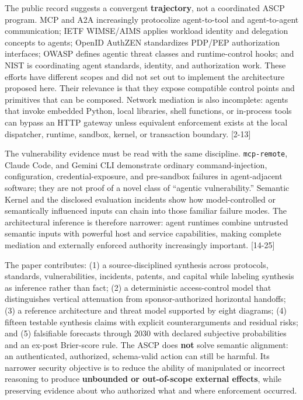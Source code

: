 \documentclass[
  10pt,
  letterpaper,
]{article}
\begin{document}
The public record suggests a convergent \textbf{trajectory}, not a
coordinated ASCP program. MCP and A2A increasingly protocolize
agent-to-tool and agent-to-agent communication; IETF WIMSE/AIMS applies
workload identity and delegation concepts to agents; OpenID AuthZEN
standardizes PDP/PEP authorization interfaces; OWASP defines agentic
threat classes and runtime-control hooks; and NIST is coordinating agent
standards, identity, and authorization work. These efforts have
different scopes and did not set out to implement the architecture
proposed here. Their relevance is that they expose compatible control
points and primitives that can be composed. Network mediation is also
incomplete: agents that invoke embedded Python, local libraries, shell
functions, or in-process tools can bypass an HTTP gateway unless
equivalent enforcement exists at the local dispatcher, runtime, sandbox,
kernel, or transaction boundary. {[}2-13{]}

The vulnerability evidence must be read with the same discipline.
\texttt{mcp-remote}, Claude Code, and Gemini CLI demonstrate ordinary
command-injection, configuration, credential-exposure, and pre-sandbox
failures in agent-adjacent software; they are not proof of a novel class
of ``agentic vulnerability.'' Semantic Kernel and the disclosed
evaluation incidents show how model-controlled or semantically
influenced inputs can chain into those familiar failure modes. The
architectural inference is therefore narrower: agent runtimes combine
untrusted semantic inputs with powerful host and service capabilities,
making complete mediation and externally enforced authority increasingly
important. {[}14-25{]}

The paper contributes: (1) a source-disciplined synthesis across
protocols, standards, vulnerabilities, incidents, patents, and capital
while labeling synthesis as inference rather than fact; (2) a
deterministic access-control model that distinguishes vertical
attenuation from sponsor-authorized horizontal handoffs; (3) a reference
architecture and threat model supported by eight diagrams; (4) fifteen
testable synthesis claims with explicit counterarguments and residual
risks; and (5) falsifiable forecasts through 2030 with declared
subjective probabilities and an ex-post Brier-score rule. The ASCP does
\textbf{not} solve semantic alignment: an authenticated, authorized,
schema-valid action can still be harmful. Its narrower security
objective is to reduce the ability of manipulated or incorrect reasoning
to produce \textbf{unbounded or out-of-scope external effects}, while
preserving evidence about who authorized what and where enforcement
occurred.
\end{document}
